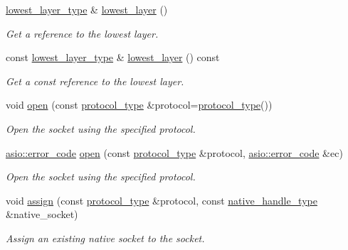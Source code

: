 \begin{DoxyCompactItemize}
\hyperlink{classasio_1_1basic__socket_a7e749e9f9d470ab881564bd549473d2f}{lowest\+\_\+layer\+\_\+type} \& \hyperlink{classasio_1_1basic__socket_acd1a03601cf874d77169f9294e6ebad4}{lowest\+\_\+layer} ()
\begin{DoxyCompactList}\small\item\em Get a reference to the lowest layer. \end{DoxyCompactList}\item 
const \hyperlink{classasio_1_1basic__socket_a7e749e9f9d470ab881564bd549473d2f}{lowest\+\_\+layer\+\_\+type} \& \hyperlink{classasio_1_1basic__socket_ad6bebdaea69afd872f153d3ce5daaec7}{lowest\+\_\+layer} () const 
\begin{DoxyCompactList}\small\item\em Get a const reference to the lowest layer. \end{DoxyCompactList}\item 
void \hyperlink{classasio_1_1basic__socket_addde141b21499e7918c5a93c3cbab1d1}{open} (const \hyperlink{classasio_1_1basic__socket_a5890addc84762c67f2b3f1723428721d}{protocol\+\_\+type} \&protocol=\hyperlink{classasio_1_1basic__socket_a5890addc84762c67f2b3f1723428721d}{protocol\+\_\+type}())
\begin{DoxyCompactList}\small\item\em Open the socket using the specified protocol. \end{DoxyCompactList}\item 
\hyperlink{classasio_1_1error__code}{asio\+::error\+\_\+code} \hyperlink{classasio_1_1basic__socket_a9cd7189fb57ad92321affbae2e7bcd01}{open} (const \hyperlink{classasio_1_1basic__socket_a5890addc84762c67f2b3f1723428721d}{protocol\+\_\+type} \&protocol, \hyperlink{classasio_1_1error__code}{asio\+::error\+\_\+code} \&ec)
\begin{DoxyCompactList}\small\item\em Open the socket using the specified protocol. \end{DoxyCompactList}\item 
void \hyperlink{classasio_1_1basic__socket_ae2f61d380b2814ff960598e457cd9c6a}{assign} (const \hyperlink{classasio_1_1basic__socket_a5890addc84762c67f2b3f1723428721d}{protocol\+\_\+type} \&protocol, const \hyperlink{classasio_1_1basic__socket_a3481ac06d51afa0cb23f09cd39ac64eb}{native\+\_\+handle\+\_\+type} \&native\+\_\+socket)
\begin{DoxyCompactList}\small\item\em Assign an existing native socket to the socket. \end{DoxyCompactList}\item 

\end{DoxyCompactItemize}

